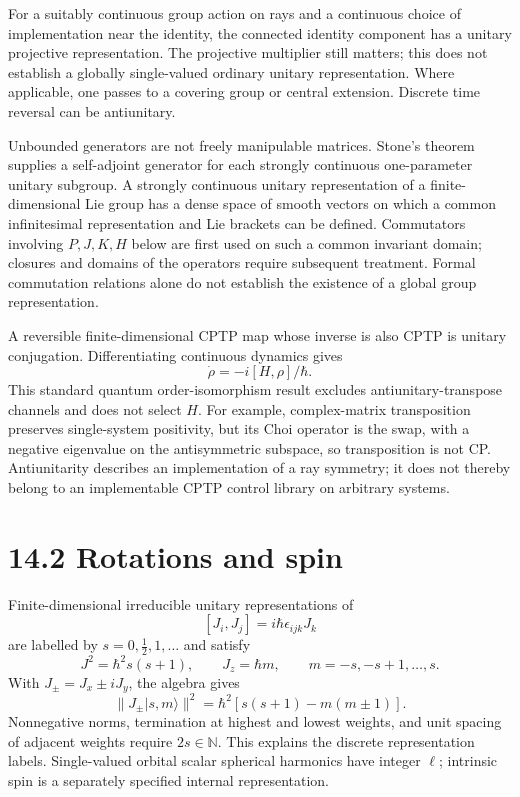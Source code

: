 \documentclass[
  11pt,
  oneside]{book}
\begin{document}
For a suitably continuous group action on rays and a continuous choice
of implementation near the identity, the connected identity component
has a unitary projective representation. The projective multiplier still
matters; this does not establish a globally single-valued ordinary
unitary representation. Where applicable, one passes to a covering group
or central extension. Discrete time reversal can be antiunitary.

Unbounded generators are not freely manipulable matrices. Stone's
theorem supplies a self-adjoint generator for each strongly continuous
one-parameter unitary subgroup. A strongly continuous unitary
representation of a finite-dimensional Lie group has a dense space of
smooth vectors on which a common infinitesimal representation and Lie
brackets can be defined. Commutators involving \(P,J,K,H\) below are
first used on such a common invariant domain; closures and domains of
the operators require subsequent treatment. Formal commutation relations
alone do not establish the existence of a global group representation.

A reversible finite-dimensional CPTP map whose inverse is also CPTP is
unitary conjugation. Differentiating continuous dynamics gives \[
\dot\rho=-i[H,\rho]/\hbar.
\] This standard quantum order-isomorphism result excludes
antiunitary-transpose channels and does not select \(H\). For example,
complex-matrix transposition preserves single-system positivity, but its
Choi operator is the swap, with a negative eigenvalue on the
antisymmetric subspace, so transposition is not CP. Antiunitarity
describes an implementation of a ray symmetry; it does not thereby
belong to an implementable CPTP control library on arbitrary systems.

\section{14.2 Rotations and spin}

Finite-dimensional irreducible unitary representations of \[
[J_i,J_j]=i\hbar\epsilon_{ijk}J_k
\] are labelled by \(s=0,\tfrac12,1,\ldots\) and satisfy \[
J^2=\hbar^2s(s+1),\qquad J_z=\hbar m,
\qquad m=-s,-s+1,\ldots,s.
\] With \(J_\pm=J_x\pm iJ_y\), the algebra gives \[
\|J_\pm|s,m\rangle\|^2
=\hbar^2[s(s+1)-m(m\pm1)].
\] Nonnegative norms, termination at highest and lowest weights, and
unit spacing of adjacent weights require \(2s\in\mathbb N\). This
explains the discrete representation labels. Single-valued orbital
scalar spherical harmonics have integer \(\ell\); intrinsic spin is a
separately specified internal representation.
\end{document}
